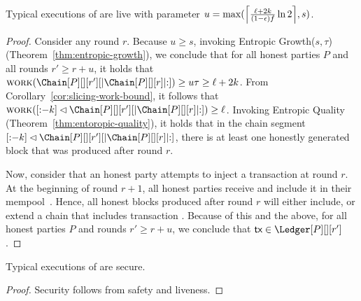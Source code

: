 \begin{conjecture}
  Typical executions of \poem are live with parameter $u = \max(\ceil*{\frac{\ell + 2k}{(1 - \epsilon) f} \ln2}, s)$.
\end{conjecture}
\begin{proof}
  Consider any round $r$.
  Because $u \geq s$, invoking Entropic Growth($s, \tau$) (Theorem~\ref{thm:entropic-growth}), we conclude that
  for all honest parties $P$ and all rounds $r' \geq r + u$, it holds that
  $\work(\Chain[P][][r'][|\Chain[P][][r]|{:}]) \geq u \tau \geq \ell + 2k$.
  From Corollary~\ref{cor:slicing-work-bound}, it follows that
  $\work([{:}{-k}] \lhd \Chain[P][][r'][|\Chain[P][][r]|{:}]) \geq \ell$.
  Invoking Entropic Quality (Theorem~\ref{thm:entoropic-quality}),
  it holds that in the chain segment $[{:}{-k}] \lhd \Chain[P][][r'][|\Chain[P][][r]|{:}]$,
  there is at least one honestly generated block that was produced after round $r$.

  Now, consider that an honest party attempts to inject a transaction \tx
  at round $r$. At the beginning of round $r + 1$, all honest parties
  receive \tx and include it in their mempool~\cite[Section 5.7]{blockchain-foundations}.
  Hence, all honest blocks produced
  after round $r$ will either include, or extend a chain that includes transaction \tx.
  Because of this and the above, for all honest parties $P$ and rounds $r' \geq r + u$,
  we conclude that $\tx \in \Ledger[P][][r']$.
  \Qed
\end{proof}

\begin{corollary}
  Typical executions of \poem are secure.
\end{corollary}
\begin{proof}
  Security follows from safety and liveness.
  \Qed
\end{proof}
